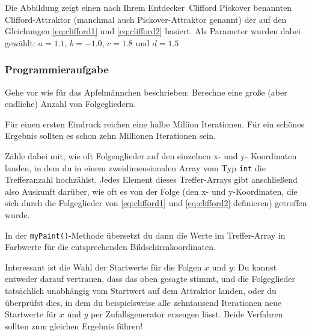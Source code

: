 Die Abbildung zeigt einen nach Ihrem \glqq Entdecker\grqq\ Clifford
Pickover benannten Clifford-Attraktor (manchmal auch Pickover-Attraktor
genannt) der auf den Gleichungen \ref{eq:clifford1} und \ref{eq:clifford2}
basiert. Als Parameter wurden dabei gewählt: $a=1.1$, $b=-1.0$, $c=1.8$ und
$d=1.5$


\subsubsection{Programmieraufgabe}

Gehe vor wie für das Apfelmännchen beschrieben: Berechne eine große (aber
endliche) Anzahl von Folgegliedern.

Für einen ersten Eindruck reichen eine halbe Million Iterationen. Für ein
schönes Ergebnis sollten es schon zehn Millionen Iterationen sein.

Zähle dabei mit, wie oft Folgenglieder auf den einzelnen x- und y- Koordinaten
landen, in dem du in einem zweidimensionalen Array vom Typ \lstinline|int| die
Trefferanzahl hochzählst. Jedes Element dieses Treffer-Arrays gibt anschließend
also Auskunft darüber, wie oft es von der Folge (den x- und
y-Koordinaten, die sich durch die Folgeglieder von  \ref{eq:clifford1} und
\ref{eq:clifford2} definieren) getroffen wurde.

In der \lstinline|myPaint()|-Methode übersetzt du dann die Werte im
Treffer-Array in Farbwerte für die entsprechenden Bildschirmkoordinaten.

Interessant ist die Wahl der Startwerte für die Folgen $x$ und $y$: Du kannst
entweder darauf vertrauen, dass das oben gesagte stimmt, und die Folgeglieder
tatsächlich unabhängig vom Startwert auf dem Attraktor landen, oder du
überprüfst dies, in dem du beispielsweise alle zehntausend Iterationen neue
Startwerte für $x$ und $y$ per Zufallsgenerator erzeugen lässt. Beide Verfahren
sollten zum gleichen Ergebnis führen!


